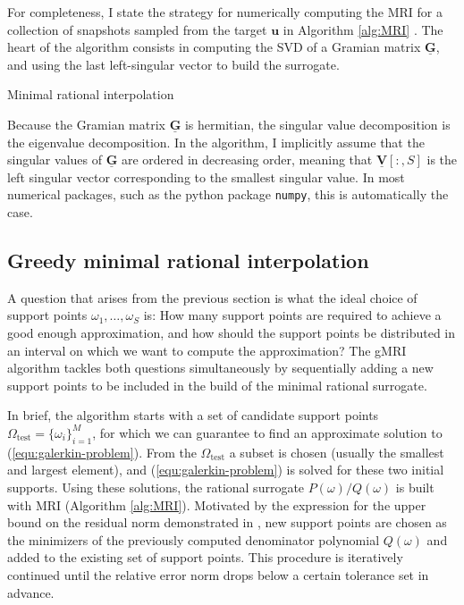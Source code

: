\documentclass[11pt, a4paper]{article}
\begin{document}
For completeness, I state the strategy for numerically computing the \acrshort{MRI} 
for a collection of snapshots sampled from the target $\mathbf{u}$
in Algorithm \ref{alg:MRI} \citep{greedyMRI}. The heart of the algorithm consists in computing the
\acrfull{SVD} of a Gramian matrix $\mathbf{\underline{G}}$, and using the last
left-singular vector to build the surrogate.

\begin{algorithm}
    \caption{Minimal rational interpolation} \label{alg:MRI}
    
\end{algorithm}

Because the Gramian matrix $\mathbf{\underline{G}}$ is hermitian, the singular value
decomposition is the eigenvalue decomposition.
In the algorithm, I implicitly assume that the singular values of $\mathbf{\underline{G}}$
are ordered in decreasing order, meaning that $\mathbf{\underline{V}}[:, S]$
is the left singular vector corresponding to the smallest singular value. In most
numerical packages, such as the python package \texttt{numpy}, this is automatically the case.

\subsection{Greedy minimal rational interpolation}
\label{subsec:gMRI}

A question that arises from the previous section is what the ideal choice of
support points $\omega_1, \dots, \omega_S$ is: How many support points are
required to achieve a good enough approximation, and how should the support points
be distributed in an interval on which we want to compute the approximation?
The \acrfull{gMRI} algorithm \citep{shortMRI} tackles both questions
simultaneously by sequentially adding a new support points to be included in the
build of the minimal rational surrogate.

In brief, the algorithm starts with a set of candidate support points
$\Omega_{\mathrm{test}} = \{\omega_i\}_{i=1}^M$, for which we can guarantee
to find an approximate solution to (\ref{equ:galerkin-problem}). 
From the $\Omega_{\mathrm{test}}$ a subset is chosen (usually the smallest and
largest element), and (\ref{equ:galerkin-problem}) is solved for these two initial
supports. Using these solutions, the rational surrogate $P(\omega)/Q(\omega)$ is built with
\acrshort{MRI} (Algorithm \ref{alg:MRI}). Motivated by the expression for the
upper bound on the residual norm demonstrated in \cite{theoryMRI}, new support
points are chosen as the minimizers of the previously computed denominator polynomial $Q(\omega)$
and added to the existing set of support points. This procedure is iteratively
continued until the relative error norm drops below a certain tolerance set in advance.
\end{document}
